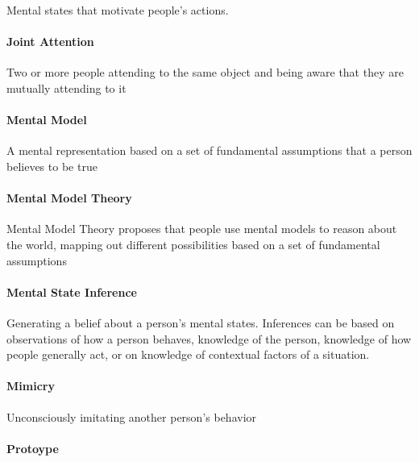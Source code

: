 \documentclass[
]{krantz}
\begin{document}
Mental states that motivate people's actions.

\paragraph*{Joint Attention}\label{joint-attention}

Two or more people attending to the same object and being aware that they are mutually attending to it

\paragraph*{Mental Model}\label{mental-model}

A mental representation based on a set of fundamental assumptions that a person believes to be true

\paragraph*{Mental Model Theory}\label{mental-model-theory}

Mental Model Theory proposes that people use mental models to reason about the world, mapping out different possibilities based on a set of fundamental assumptions

\paragraph*{Mental State Inference}\label{mental-state-inference}

Generating a belief about a person's mental states. Inferences can be based on observations of how a person behaves, knowledge of the person, knowledge of how people generally act, or on knowledge of contextual factors of a situation.

\paragraph*{Mimicry}\label{mimicry}

Unconsciously imitating another person's behavior

\paragraph*{Protoype}\label{protoype}
\end{document}
